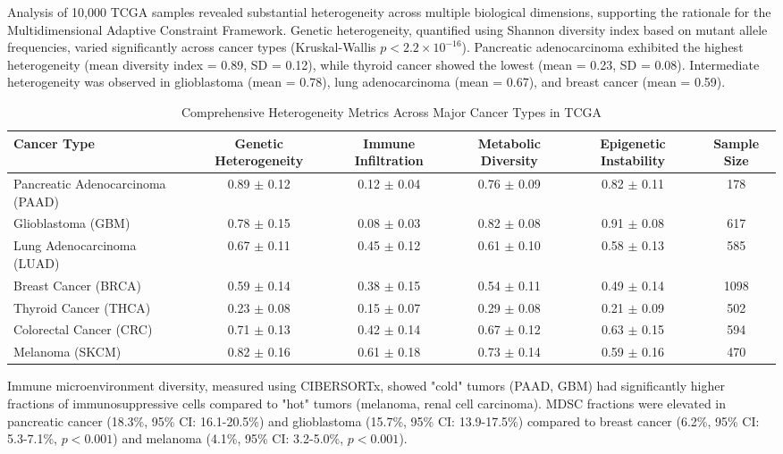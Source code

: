 \documentclass[12pt,a4paper]{article}
\begin{document}
Analysis of 10,000 TCGA samples revealed substantial heterogeneity across multiple biological dimensions, supporting the rationale for the Multidimensional Adaptive Constraint Framework. Genetic heterogeneity, quantified using Shannon diversity index based on mutant allele frequencies, varied significantly across cancer types (Kruskal-Wallis $p < 2.2\times10^{-16}$). Pancreatic adenocarcinoma exhibited the highest heterogeneity (mean diversity index = 0.89, SD = 0.12), while thyroid cancer showed the lowest (mean = 0.23, SD = 0.08). Intermediate heterogeneity was observed in glioblastoma (mean = 0.78), lung adenocarcinoma (mean = 0.67), and breast cancer (mean = 0.59).

\begin{table}[H]
\centering
\caption{Comprehensive Heterogeneity Metrics Across Major Cancer Types in TCGA}
\label{tab:heterogeneity_tcga}
\begin{tabular}{lccccc}
\toprule
\textbf{Cancer Type} & \textbf{Genetic Heterogeneity} & \textbf{Immune Infiltration} & \textbf{Metabolic Diversity} & \textbf{Epigenetic Instability} & \textbf{Sample Size} \\
\midrule
Pancreatic Adenocarcinoma (PAAD) & 0.89 $\pm$ 0.12 & 0.12 $\pm$ 0.04 & 0.76 $\pm$ 0.09 & 0.82 $\pm$ 0.11 & 178 \\
Glioblastoma (GBM) & 0.78 $\pm$ 0.15 & 0.08 $\pm$ 0.03 & 0.82 $\pm$ 0.08 & 0.91 $\pm$ 0.08 & 617 \\
Lung Adenocarcinoma (LUAD) & 0.67 $\pm$ 0.11 & 0.45 $\pm$ 0.12 & 0.61 $\pm$ 0.10 & 0.58 $\pm$ 0.13 & 585 \\
Breast Cancer (BRCA) & 0.59 $\pm$ 0.14 & 0.38 $\pm$ 0.15 & 0.54 $\pm$ 0.11 & 0.49 $\pm$ 0.14 & 1098 \\
Thyroid Cancer (THCA) & 0.23 $\pm$ 0.08 & 0.15 $\pm$ 0.07 & 0.29 $\pm$ 0.08 & 0.21 $\pm$ 0.09 & 502 \\
Colorectal Cancer (CRC) & 0.71 $\pm$ 0.13 & 0.42 $\pm$ 0.14 & 0.67 $\pm$ 0.12 & 0.63 $\pm$ 0.15 & 594 \\
Melanoma (SKCM) & 0.82 $\pm$ 0.16 & 0.61 $\pm$ 0.18 & 0.73 $\pm$ 0.14 & 0.59 $\pm$ 0.16 & 470 \\
\bottomrule
\end{tabular}
\end{table}

Immune microenvironment diversity, measured using CIBERSORTx, showed "cold" tumors (PAAD, GBM) had significantly higher fractions of immunosuppressive cells compared to "hot" tumors (melanoma, renal cell carcinoma). MDSC fractions were elevated in pancreatic cancer (18.3\%, 95\% CI: 16.1-20.5\%) and glioblastoma (15.7\%, 95\% CI: 13.9-17.5\%) compared to breast cancer (6.2\%, 95\% CI: 5.3-7.1\%, $p < 0.001$) and melanoma (4.1\%, 95\% CI: 3.2-5.0\%, $p < 0.001$).
\end{document}
